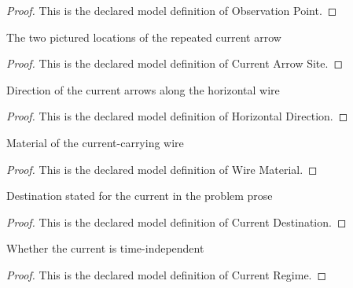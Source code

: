 \begin{proof}
  This is the declared model definition of Observation Point.
\end{proof}
\begin{definition}
  \label{def:physics:phyx-mini-0916:phyxminiproblems-problemphyxmini0916-currentarrowsite}
  The two pictured locations of the repeated current arrow
\end{definition}
\begin{proof}
  This is the declared model definition of Current Arrow Site.
\end{proof}
\begin{definition}
  \label{def:physics:phyx-mini-0916:phyxminiproblems-problemphyxmini0916-horizontaldirection}
  Direction of the current arrows along the horizontal wire
\end{definition}
\begin{proof}
  This is the declared model definition of Horizontal Direction.
\end{proof}
\begin{definition}
  \label{def:physics:phyx-mini-0916:phyxminiproblems-problemphyxmini0916-wirematerial}
  Material of the current-carrying wire
\end{definition}
\begin{proof}
  This is the declared model definition of Wire Material.
\end{proof}
\begin{definition}
  \label{def:physics:phyx-mini-0916:phyxminiproblems-problemphyxmini0916-currentdestination}
  Destination stated for the current in the problem prose
\end{definition}
\begin{proof}
  This is the declared model definition of Current Destination.
\end{proof}
\begin{definition}
  \label{def:physics:phyx-mini-0916:phyxminiproblems-problemphyxmini0916-currentregime}
  Whether the current is time-independent
\end{definition}
\begin{proof}
  This is the declared model definition of Current Regime.
\end{proof}
